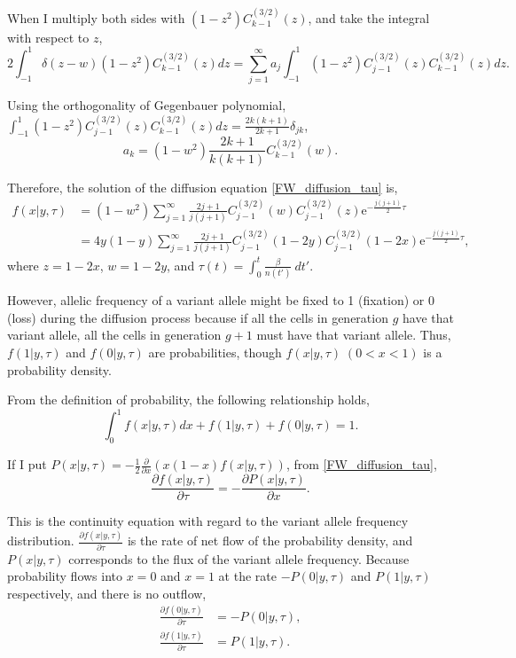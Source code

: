 \documentclass[12pt]{article}
\newcommand{\napier}{\mathrm{e}}
\newcommand{\henbibun}[2]{\frac{\partial {#1}}{\partial {#2}}}
\begin{document}
When I multiply both sides with $(1-z^2) C^{(3/2)}_{k-1} (z)$, and take the integral with respect to $z$,
\begin{equation}
 2\int_{-1}^{1}\delta(z-w) (1-z^2) C^{(3/2)}_{k-1} (z) dz= \sum_{j=1}^{\infty} a_j \int_{-1}^{1} (1-z^2) C^{(3/2)}_{j-1} (z) C^{(3/2)}_{k-1} (z) dz.
\end{equation}

Using the orthogonality of Gegenbauer polynomial, $\int_{-1}^{1} (1-z^2) C^{(3/2)}_{j-1} (z) C^{(3/2)}_{k-1} (z) dz = \frac{2k(k+1)}{2k+1} \delta_{jk}$,
\begin{equation}
 a_k = (1-w^2) \frac{2k+1}{k(k+1)} C^{(3/2)}_{k-1} (w).
\end{equation}

Therefore, the solution of the diffusion equation \eqref{FW_diffusion_tau} is,
\begin{align}
 f(x|y,\tau) & = (1-w^2) \sum_{j=1}^{\infty} \frac{2j+1}{j(j+1)} C^{(3/2)}_{j-1} (w) C^{(3/2)}_{j-1} (z) \napier^{-\frac{j(j+1)}{2}\tau}\\
 & = 4y(1-y) \sum_{j=1}^{\infty} \frac{2j+1}{j(j+1)} C^{(3/2)}_{j-1} (1-2y) C^{(3/2)}_{j-1} (1-2x) \napier^{-\frac{j(j+1)}{2}\tau},\label{wf_solution_x}
\end{align}
where $z=1-2x$, $w=1-2y$, and $\tau(t) = \int_{0}^{t} \frac{\beta}{n(t')} \: dt'$.

However, allelic frequency of a variant allele might be fixed to 1 (fixation) or 0 (loss) during the diffusion process because if all the cells in generation $g$ have that variant allele, all the cells in generation $g+1$ must have that variant allele. Thus, $f(1|y,\tau)$ and $f(0|y,\tau)$ are probabilities, though $f(x|y,\tau) \; (0<x<1)$ is a probability density.

From the definition of probability, the following relationship holds,
\begin{equation}
 \int_{0}^{1} f(x|y,\tau) dx + f(1|y,\tau) + f(0|y,\tau) = 1.
\end{equation}

If I put $P(x|y,\tau) = - \frac{1}{2} \henbibun{}{x}\left( x(1-x)f(x|y,\tau) \right)$, from \eqref{FW_diffusion_tau},
\begin{equation}
 \henbibun{f(x|y,\tau)}{\tau} = - \henbibun{P(x|y, \tau)}{x}.
\end{equation}

This is the continuity equation with regard to the variant allele frequency distribution.
$\henbibun{f(x|y,\tau)}{\tau}$ is the rate of net flow of the probability density, and $P(x|y,\tau)$ corresponds to the flux of the variant allele frequency.
Because probability flows into $x=0$ and $x=1$ at the rate $-P(0|y,\tau)$ and $P(1|y,\tau)$ respectively, and there is no outflow,
\begin{align}
 \henbibun{f(0|y,\tau)}{\tau} & = -P(0|y, \tau),\label{fixation_flow}\\
 \henbibun{f(1|y,\tau)}{\tau} & = P(1|y, \tau).\label{loss_flow}
\end{align}
\end{document}
